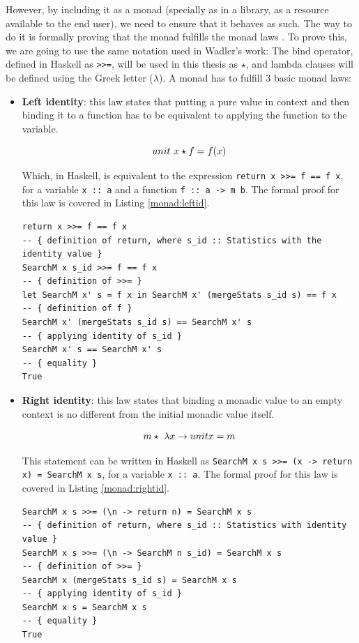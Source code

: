 However, by including it as a monad (specially as in a library, as a resource
available to the end user), we need to ensure that it behaves as such. The way
to do it is formally proving that the monad fulfills the monad laws
\cite{wadler-1993-monad}. To prove this, we are going to use the same notation
used in Wadler's work: The bind operator, defined in Haskell as
\texttt{>>=}, will be used in this thesis as $\star$, and lambda clauses will
be defined using the Greek letter ($\lambda$). A monad has to fulfill 3 basic
monad laws:

\begin{itemize}
\item \textbf{Left identity}: this law states that putting a pure value in
  context and then binding it to a function has to be equivalent to applying
  the function to the variable.

  $$
  unit \  x \star f = f(x) \\
  $$

  Which, in Haskell, is equivalent to the expression \texttt{return x >>= f ==
    f x}, for a variable \texttt{x :: a} and a function \texttt{f :: a -> m b}.
  The formal proof for this law is covered in Listing \ref{monad:leftid}.

\begin{lstlisting}[style = haskell, caption = Left identity formal proof for
\texttt{SearchM}, label = monad:leftid]
return x >>= f == f x
-- { definition of return, where s_id :: Statistics with the identity value }
SearchM x s_id >>= f == f x
-- { definition of >>= }
let SearchM x' s = f x in SearchM x' (mergeStats s_id s) == f x
-- { definition of f }
SearchM x' (mergeStats s_id s) == SearchM x' s
-- { applying identity of s_id }
SearchM x' s == SearchM x' s
-- { equality }
True
\end{lstlisting}

\item \textbf{Right identity}: this law states that binding a monadic value to
  an empty context is no different from the initial monadic value itself.

  $$
  m \star \  \lambda x \rightarrow unit x = m \\
  $$

  This statement can be written in Haskell as
  \texttt{SearchM x s >>= (x -> return x) = SearchM x s}, for a variable
  \texttt{x :: a}. The formal proof for this law is covered in Listing
  \ref{monad:rightid}.

\begin{lstlisting}[style = haskell, caption = Left identity formal proof for
\texttt{SearchM}, label = monad:rightid]
SearchM x s >>= (\n -> return n) = SearchM x s
-- { definition of return, where s_id :: Statistics with identity value }
SearchM x s >>= (\n -> SearchM n s_id) = SearchM x s
-- { definition of >>= }
SearchM x (mergeStats s_id s) = SearchM x s
-- { applying identity of s_id }
SearchM x s = SearchM x s
-- { equality }
True
\end{lstlisting}
\end{itemize}




\newpage


